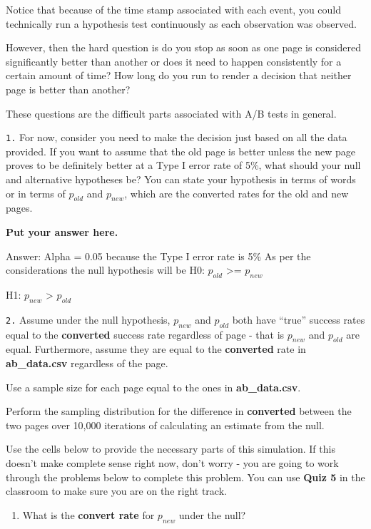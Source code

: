 \documentclass[11pt]{article}
\providecommand{\tightlist}{%
      \setlength{\itemsep}{0pt}\setlength{\parskip}{0pt}}
\begin{document}
Notice that because of the time stamp associated with each event, you
could technically run a hypothesis test continuously as each observation
was observed.

However, then the hard question is do you stop as soon as one page is
considered significantly better than another or does it need to happen
consistently for a certain amount of time? How long do you run to render
a decision that neither page is better than another?

These questions are the difficult parts associated with A/B tests in
general.

\texttt{1.} For now, consider you need to make the decision just based
on all the data provided. If you want to assume that the old page is
better unless the new page proves to be definitely better at a Type I
error rate of 5\%, what should your null and alternative hypotheses be?
You can state your hypothesis in terms of words or in terms of
\textbf{\(p_{old}\)} and \textbf{\(p_{new}\)}, which are the converted
rates for the old and new pages.

    \textbf{Put your answer here.}

Answer: Alpha = 0.05 because the Type I error rate is 5\% As per the
considerations the null hypothesis will be H0: \(p_{old}\)
\textgreater{}= \(p_{new}\)

H1: \(p_{new}\) \textgreater{} \(p_{old}\)

    \texttt{2.} Assume under the null hypothesis, \(p_{new}\) and
\(p_{old}\) both have ``true'' success rates equal to the
\textbf{converted} success rate regardless of page - that is \(p_{new}\)
and \(p_{old}\) are equal. Furthermore, assume they are equal to the
\textbf{converted} rate in \textbf{ab\_data.csv} regardless of the page.

Use a sample size for each page equal to the ones in
\textbf{ab\_data.csv}.

Perform the sampling distribution for the difference in
\textbf{converted} between the two pages over 10,000 iterations of
calculating an estimate from the null.

Use the cells below to provide the necessary parts of this simulation.
If this doesn't make complete sense right now, don't worry - you are
going to work through the problems below to complete this problem. You
can use \textbf{Quiz 5} in the classroom to make sure you are on the
right track.

    \begin{enumerate}
\def\labelenumi{\alph{enumi}.}
\tightlist
\item
  What is the \textbf{convert rate} for \(p_{new}\) under the null?
\end{enumerate}
\end{document}
